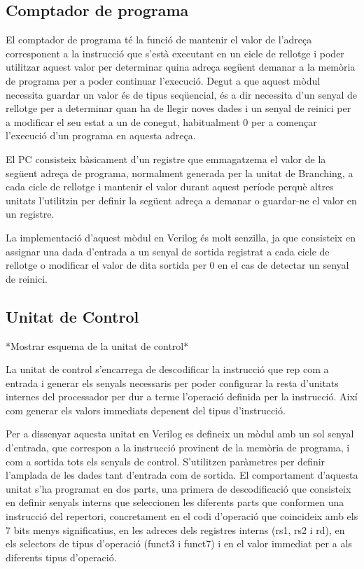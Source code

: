 \documentclass[10pt,a4paper,twocolumn,twoside]{article}
\begin{document}
    \subsection{Comptador de programa}
    
    El comptador de programa té la funció de mantenir el valor de l'adreça corresponent a la instrucció que s'està executant en un cicle de rellotge i poder utilitzar aquest valor per determinar quina adreça següent demanar a la memòria de programa per a poder continuar l'execució.
    Degut a que aquest mòdul necessita guardar un valor és de tipus seqüencial, és a dir necessita d'un senyal de rellotge per a determinar quan ha de llegir noves dades i un senyal de reinici  per a modificar el seu estat a un de conegut, habitualment 0 per a començar l'execució d'un programa en aquesta adreça. 
    
    El PC consisteix bàsicament d'un registre que emmagatzema el valor de la següent adreça de programa, normalment generada per la unitat de Branching, a cada cicle de rellotge i mantenir el valor durant aquest període perquè altres unitats l'utilitzin per definir la següent adreça a demanar o guardar-ne el valor en un registre.
    
    La implementació d'aquest mòdul en Verilog és molt senzilla, ja que consisteix en assignar una dada d'entrada a un senyal de sortida registrat a cada cicle de rellotge o modificar el valor de dita sortida per 0 en el cas de detectar un senyal de reinici. 
    
    
    \subsection{Unitat de Control}
    *Mostrar esquema de la unitat de control*
    
    La unitat de control s'encarrega de descodificar la instrucció que rep com a entrada i generar els senyals necessaris per poder configurar la resta d'unitats internes del processador per dur a terme l'operació definida per la instrucció. Així com generar els valors immediats depenent del tipus d'instrucció. 
    
    Per a dissenyar aquesta unitat en Verilog es defineix un mòdul amb un sol senyal d'entrada, que correspon a la instrucció provinent de la memòria de programa, i com a sortida tots els senyals de control. S'utilitzen paràmetres per definir l'amplada de les dades tant d'entrada com de sortida.
    El comportament d'aquesta unitat s'ha programat en dos parts, una primera de descodificació que consisteix en definir senyals interns que seleccionen les diferents parts que conformen una instrucció del repertori, concretament en el codi d'operació que coincideix amb els 7 bits menys significatius, en les adreces dels registres interns (rs1, rs2 i rd), en els selectors de tipus d'operació (funct3 i funct7) i en el valor immediat per a als diferents tipus d'operació.
    
\end{document}
